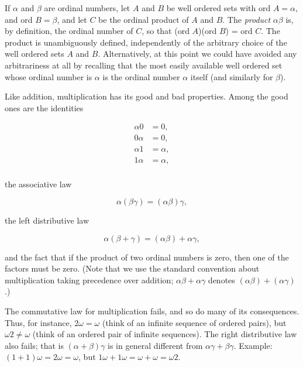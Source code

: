 If $\alpha$ and $\beta$ are ordinal numbers, let $A$ and $B$ be well ordered sets with ord $A = \alpha$, and ord $B = \beta$, and let $C$ be the ordinal product of $A$ and $B$. The \textit{product} $\alpha \beta$ is, by definition, the ordinal number of $C$, so that (ord $A$)(ord $B$) = ord $C$. The product is unambiguously  defined, independently of the arbitrary choice of the well ordered sets $A$ and $B$. Alternatively, at this point we could have avoided any arbitrariness at all by recalling that the most easily available well ordered set whose  ordinal number is $\alpha$ is the ordinal number $\alpha$ itself (and similarly for $\beta$). 

Like addition, multiplication has its good and bad properties.   Among the good ones are the identities 

\begin{align*}
\alpha 0 &= 0,\\
0 \alpha &= 0,\\
\alpha 1 &= \alpha ,\\
1 \alpha &= \alpha ,\\
\end{align*}

the associative law 

\begin{equation*}
\alpha ( \beta \gamma) = ( \alpha \beta ) \gamma , 
\end{equation*}

the left distributive law

\begin{equation*}
\alpha ( \beta  +\gamma) = ( \alpha \beta ) + \alpha \gamma , 
\end{equation*}

and the fact that if the product of two ordinal numbers is zero, then one of the factors must be zero. (Note that we use the standard convention about multiplication taking precedence over addition; $\alpha \beta + \alpha \gamma$ denotes $(\alpha \beta) + (\alpha \gamma)$.) 

The commutative law for multiplication fails, and so do many of its consequences. Thus, for instance, $2 \omega = \omega$ (think of an infinite sequence of ordered pairs), but $\omega 2 \neq \omega$ (think of an ordered pair of infinite sequences). The right distributive law also fails; that is $(\alpha + \beta) \gamma$ is in general different from $\alpha \gamma + \beta \gamma$. Example: $(1 + 1) \omega = 2 \omega = \omega$, but $1 \omega + 1 \omega = \omega + \omega = \omega 2$. 

